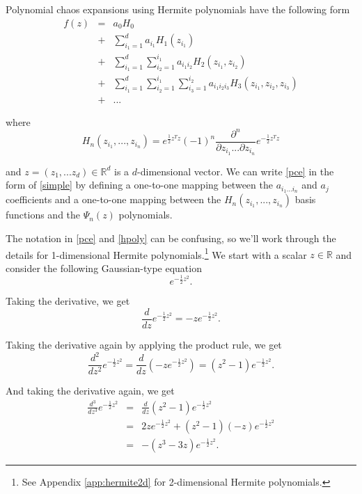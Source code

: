 \documentclass[11pt]{article}
\numberwithin{equation}{section}
\begin{document}
\qquad Polynomial chaos expansions using Hermite polynomials have the following form
\begin{eqnarray}
f(z) & = & a_0 H_0 \nonumber \\
& + & \sum_{i_1 = 1}^{d} a_{i_1} H_1(z_{i_1}) \nonumber \\
& + & \sum_{i_1 = 1}^{d} \sum_{i_2 = 1}^{i_1} a_{i_1 i_2} H_2(z_{i_1}, z_{i_2}) \nonumber \\
& + & \sum_{i_1 = 1}^{d} \sum_{i_2 = 1}^{i_1} \sum_{i_3 = 1}^{i_2} a_{i_1 i_2 i_3} H_3(z_{i_1}, z_{i_2}, z_{i_3}) \nonumber \\
& + & ... \label{pce}
\end{eqnarray}

where
\begin{equation}
H_n(z_{i_1}, ..., z_{i_n}) = e^{\frac{1}{2} z^T z} (-1)^n \frac{\partial^n}{\partial z_{i_1} ... \partial z_{i_n}} e^{-\frac{1}{2} z^T z} \label{hpoly}
\end{equation}

and $z = (z_1, ... z_d) \in \mathbb{R}^d$ is a $d$-dimensional vector.  We can write \eqref{pce} in the form of \eqref{simple} by defining a one-to-one mapping between the $a_{i_1 ... i_n}$ and $a_j$ coefficients and a one-to-one mapping between the $H_n(z_{i_1}, ..., z_{i_n})$ basis functions and the $\Psi_n(z)$ polynomials.

\qquad The notation in \eqref{pce} and \eqref{hpoly} can be confusing, so we'll work through the details for 1-dimensional Hermite polynomials.\footnote{See Appendix \ref{app:hermite2d} for 2-dimensional Hermite polynomials.} We start with a scalar $z \in \mathbb{R}$ and consider the following Gaussian-type equation
\begin{equation}
e^{-\frac{1}{2} z^2}. \label{gaussian_exp}
\end{equation}

Taking the derivative, we get
\begin{equation*}
\frac{d}{dz} e^{-\frac{1}{2} z^2} = -z e^{-\frac{1}{2} z^2}.
\end{equation*}

Taking the derivative again by applying the product rule, we get 
\begin{equation*}
\frac{d^2}{dz^2} e^{-\frac{1}{2} z^2} = \frac{d}{dz} \left( -z e^{-\frac{1}{2} z^2} \right) = \left( z^2 - 1 \right) e^{-\frac{1}{2} z^2}.
\end{equation*}

And taking the derivative again, we get 
\begin{eqnarray*}
\frac{d^3}{dz^3} e^{-\frac{1}{2} z^2} & = & \frac{d}{dz} \left( z^2 - 1 \right) e^{-\frac{1}{2} z^2} \nonumber \\
& = & 2 z e^{-\frac{1}{2} z^2} + (z^2 - 1) (-z) e^{-\frac{1}{2} z^2} \nonumber \\
& = & -( z^3 - 3 z) e^{-\frac{1}{2} z^2}.
\end{eqnarray*}
\end{document}
